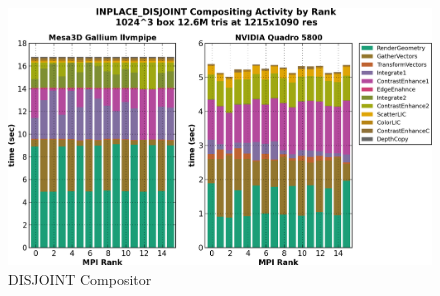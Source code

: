 \documentclass[a4paper,10pt]{article}
\begin{document}
\begin{figure}[h]
 \centering
 \includegraphics[width=1.1\textwidth]{./scaling-gant-inplace-disjoint-composite-gpu-mesa.png}
 \caption{DISJOINT Compositor}
 \label{fig:disj-comp}
\end{figure}
\end{document}
